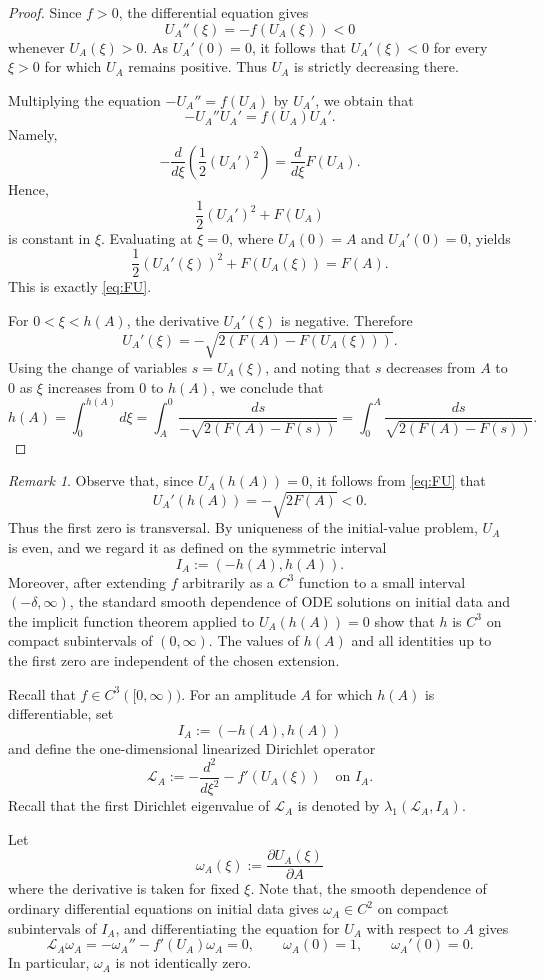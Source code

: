 \documentclass[reqno,12pt]{amsart}
\numberwithin{equation}{section}
\theoremstyle{remark}
\newtheorem{remark}[theorem]{Remark}
\begin{document}
\begin{proof}
Since $f>0$, the differential equation gives
$$
U_A''(\xi)=-f(U_A(\xi))<0
$$
whenever $U_A(\xi)>0$.  As $U_A'(0)=0$, it follows that
$U_A'(\xi)<0$ for every $\xi>0$ for which $U_A$ remains positive.  Thus $U_A$ is strictly decreasing there.

Multiplying the equation $-U_A''=f(U_A)$ by $U_A'$, we obtain that
$$
-U_A''U_A'=f(U_A)U_A'.
$$
Namely, 
$$
-\frac{d}{d\xi}\left(\frac12(U_A')^2\right) = \frac{d}{d\xi}F(U_A).
$$
Hence, 
$$
\frac 1 2 (U_A')^2+F(U_A)
$$
is constant in $\xi$.  Evaluating at $\xi=0$, where $U_A(0)=A$ and $U_A'(0)=0$, yields
$$
\frac12(U_A'(\xi))^2+F(U_A(\xi))=F(A).
$$
This is exactly \eqref{eq:FU}. 

For $0<\xi<h(A)$, the derivative $U_A'(\xi)$ is negative.  Therefore
$$
U_A'(\xi)=-\sqrt{2(F(A)-F(U_A(\xi)))}.
$$
Using the change of variables $s=U_A(\xi)$, and noting that $s$ decreases from
$A$ to $0$ as $\xi$ increases from $0$ to $h(A)$, we conclude that
$$
h(A)=\int_0^{h(A)}d\xi
= \int_A^0\frac{ds}{-\sqrt{2(F(A)-F(s))}}
= \int_0^A\frac{ds}{\sqrt{2(F(A)-F(s))}}.
$$
\end{proof}
\begin{remark}
Observe that, since $U_A(h(A))=0$, it follows from \eqref{eq:FU} that
$$
U_A'(h(A))=-\sqrt{2F(A)}<0.
$$
Thus the first zero is transversal. By uniqueness of the initial-value problem, $U_A$ is even, and we regard it as defined on the symmetric interval
$$
I_A:=(-h(A),h(A)).
$$
Moreover, after extending $f$ arbitrarily as a $C^3$ function to a small interval $(-\delta,\infty)$, the standard smooth dependence of ODE solutions on initial data and the implicit function theorem applied to
$U_A(h(A))=0$
show that $h$ is $C^3$ on compact subintervals of $(0,\infty)$. The values of $h(A)$ and all identities up to the first zero are independent of the chosen extension.
\end{remark}
 

Recall that $f\in C^3([0,\infty))$.  For an amplitude $A$ for which
$h(A)$ is differentiable, set
$$
I_A:=(-h(A),h(A))
$$
and define the one-dimensional linearized Dirichlet operator
$$
\mathcal L_A:=-\frac{d^2}{d\xi^2}-f'(U_A(\xi))
\quad\text{on }I_A.
$$
Recall that the first Dirichlet eigenvalue of $\mathcal L_A$ is denoted by $\lambda_1(\mathcal L_A,I_A)$.

Let
$$
\omega_A(\xi):=\frac{\partial U_A(\xi)}{\partial A}
$$
where the derivative is taken for fixed $\xi$. Note that, the smooth dependence of
ordinary differential equations on initial data gives $\omega_A\in C^2$ on compact subintervals of $I_A$, and differentiating the equation for $U_A$
with respect to $A$ gives
\begin{equation}\label{eq:eigen-omega}
\mathcal L_ A \omega_A= -\omega_A''-f'(U_A)\omega_A=0 , \qquad \omega_A(0)=1, \qquad \omega_A'(0)=0.
\end{equation}
In particular, $\omega_A$ is not identically zero. 
\end{document}
